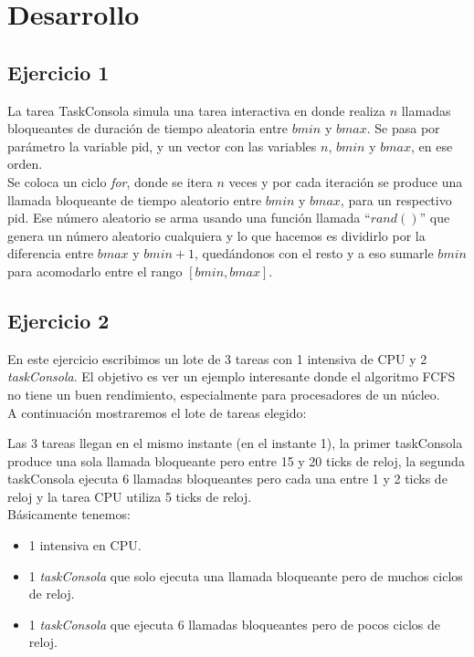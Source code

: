 \section{Desarrollo}

\subsection{Ejercicio 1}

La tarea TaskConsola simula una tarea interactiva en donde realiza $n$ llamadas bloqueantes de duración de tiempo aleatoria entre $bmin$ y $bmax$. Se pasa por parámetro la variable pid, y un vector con las variables $n$, $bmin$ y $bmax$, en ese orden. \\

Se coloca un ciclo \textit{for}, donde se itera $n$ veces y por cada iteración se produce una llamada bloqueante de tiempo aleatorio entre $bmin$ y $bmax$, para un respectivo pid. Ese número aleatorio se arma usando una función llamada ``$rand()$'' que genera un número aleatorio cualquiera y lo que hacemos es dividirlo por la diferencia entre $bmax$ y $bmin + 1$, quedándonos con el resto y a eso sumarle $bmin$ para acomodarlo entre el rango $[bmin, bmax]$. \\


\subsection{Ejercicio 2}

En este ejercicio escribimos un lote de 3 tareas con 1 intensiva de CPU y 2 \textit{taskConsola}. 
El objetivo es ver un ejemplo interesante donde el algoritmo FCFS no tiene un buen rendimiento,
especialmente para procesadores de un núcleo. \\

\noindent
A continuación mostraremos el lote de tareas elegido:


Las 3 tareas llegan en el mismo instante (en el instante 1), la primer taskConsola produce una sola llamada bloqueante pero entre 15 y 20 ticks de reloj, la segunda taskConsola ejecuta 6 llamadas bloqueantes pero cada una entre 1 y 2 ticks de reloj y la tarea CPU utiliza 5 ticks de reloj. \\

Básicamente tenemos:
\begin{itemize}
	\item 1 intensiva en CPU.
	\item 1 \textit{taskConsola} que solo ejecuta una llamada bloqueante pero de muchos ciclos de reloj.
	\item 1 \textit{taskConsola} que ejecuta 6 llamadas bloqueantes pero de pocos ciclos de reloj.
\end{itemize}

